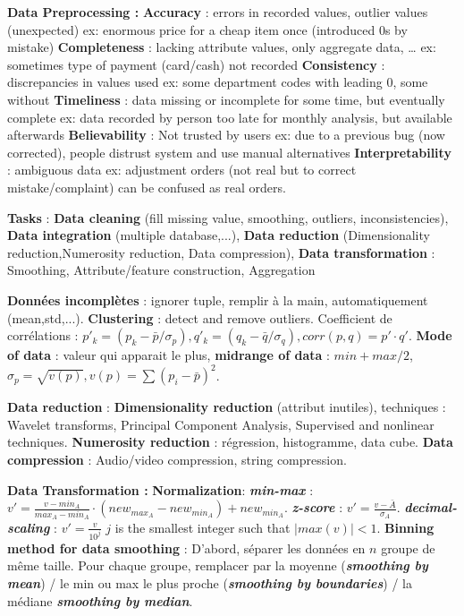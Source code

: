 \documentclass[9pt,a4paper]{report}
\author{Sylvain Julmy}
\begin{document}
\textbf{Data Preprocessing :}
\textbf{Accuracy} : errors in recorded values, outlier values (unexpected) ex: enormous price for a cheap item once (introduced 0s by mistake)
\textbf{Completeness} : lacking attribute values, only aggregate data, … ex: sometimes type of payment (card/cash) not recorded
\textbf{Consistency} : discrepancies in values used ex: some department codes with leading 0, some without
\textbf{Timeliness} : data missing or incomplete for some time, but eventually complete ex: data recorded by person too late for monthly analysis, but available afterwards
\textbf{Believability} : Not trusted by users ex: due to a previous bug (now corrected), people distrust system and use manual alternatives
\textbf{Interpretability} : ambiguous data ex: adjustment orders (not real but to correct mistake/complaint) can be confused as real orders.

\textbf{Tasks} : \textbf{Data cleaning} (fill missing value, smoothing, outliers, inconsistencies), \textbf{Data integration} (multiple database,...), \textbf{Data reduction} (Dimensionality reduction,Numerosity reduction, Data compression), \textbf{Data transformation} : Smoothing, Attribute/feature construction, Aggregation

\textbf{Données incomplètes} : ignorer tuple, remplir à la main, automatiquement (mean,std,...). \textbf{Clustering} : detect and remove outliers. Coefficient de corrélations : $p'_k = (p_k-\bar{p}/\sigma_p), q'_k = (q_k-\bar{q}/\sigma_q), corr(p,q)=p'\cdot q'$. \textbf{Mode of data} : valeur qui apparait le plus, \textbf{midrange of data} : $min + max / 2$, $\sigma_p=\sqrt{v(p)}, v(p)=\sum (p_i-\bar{p})^2$.

\textbf{Data reduction} : \textbf{Dimensionality reduction} (attribut inutiles), techniques : Wavelet transforms, Principal Component Analysis, Supervised and nonlinear techniques. \textbf{Numerosity reduction} : régression, histogramme, data cube. \textbf{Data compression} : Audio/video compression, string compression.

\textbf{Data Transformation :} \textbf{Normalization}: \textit{\textbf{min-max}} : $v'=\frac{v - min_A}{max_A - min_A}\cdot (new_{max_A} - new_{min_A})+new_{min_A}$. \textit{\textbf{z-score}} : $v'=\frac{v-\bar{A}}{\sigma_A}$. \textit{\textbf{decimal-scaling}} : $v'=\frac{v}{10^j}$  $j$ is the smallest integer such that $|max(v)| < 1$. \textbf{Binning method for data smoothing} : D'abord, séparer les données en $n$ groupe de même taille. Pour chaque groupe, remplacer par la moyenne (\textit{\textbf{smoothing by mean}}) / le min ou max le plus proche (\textit{\textbf{smoothing by boundaries}}) / la médiane \textit{\textbf{smoothing by median}}.
\end{document}
